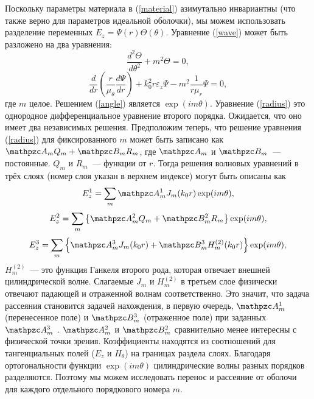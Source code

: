\documentclass[12pt]{article}
\begin{document}
Поскольку параметры материала в (\ref{material}) азимутально
инвариантны (что также верно для параметров идеальной оболочки), мы
можем использовать разделение переменных $E_z = \Psi(r)
\Theta(\theta)$. Уравнение (\ref{wave}) может быть разложено на два уравнения:
\begin{equation}\label{angle}
  \frac{d^2 \Theta}{d \theta^2} + m^2 \Theta = 0,
\end{equation}
\begin{equation}\label{radius}
  \frac{d}{dr} \left(\frac{r}{\mu_\theta} \frac{d \Psi}{dr}\right)
  + k_0^2 r \varepsilon_z \Psi - m^2 \frac{1}{r \mu_r} \Psi = 0,
\end{equation}
где $m$ целое. Решением (\ref{angle}) является $\exp(i m
\theta)$. Уравнение (\ref{radius}) это однородное дифференциальное
уравнение второго порядка. Ожидается, что оно имеет два независимых
решения. Предположим теперь, что решение уравнения (\ref{radius})
для фиксированного $m$ может быть записано как $\mathpzc A_m Q_m +
\mathpzc B_m R_m$, где $\mathpzc A_m$ и $\mathpzc B_m$~---
постоянные. $Q_m$ и $R_m$~--- функции от $r$. Тогда решения волновых
уравнений в трёх слоях (номер слоя указан в верхнем индексе) могут
быть описаны как
\begin{equation}\label{layer-1}
  E_z^1 = \sum_m \mathpzc A_m^1 J_m(k_0 r) \exp(i m \theta),
\end{equation}
\begin{equation}\label{layer-2}
  E_z^2 = \sum_m \left\{\mathpzc A_m^2 Q_m + \mathpzc B_m^2
  R_m\right\} \exp(i m \theta), 
\end{equation}
\begin{equation}\label{layer-3}
  E_z^3 = \sum_m \left\{\mathpzc A_m^3 J_m(k_0 r) + \mathpzc B_m^3
  H_m^{(2)}(k_0 r)\right\}  \exp(i m \theta),
\end{equation}
$H_m^{(2)}$~--- это функция Ганкеля второго рода, которая отвечает
внешней цилиндрической волне. Слагаемые $J_m$ и $H_m^{(2)}$ в третьем
слое физически отвечают падающей и отраженной волнам соответственно.
Это значит, что задача рассеяния становится задачей нахождения, в
первую очередь, $\mathpzc A_m^1$ (перенесенное поле) и $\mathpzc
B_m^3$ (отраженное поле) при заданных $\mathpzc A_m^3$ \cite{12}.
$\mathpzc A_m^2$ и $\mathpzc B_m^2$ сравнительно менее интересны с
физической точки зрения. Коэффициенты находятся из соотношений для
тангенциальных полей ($E_z$ и $H_\theta$) на границах раздела слоях.
Благодаря ортогональности функции $\exp(i m \theta)$ цилиндрические
волны разных порядков разделяются. Поэтому мы можем исследовать
перенос и рассеяние от оболочи для каждого отдельного порядкового
номера $m$.
\end{document}
